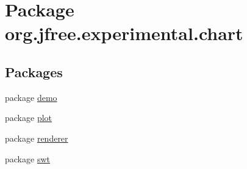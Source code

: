 \hypertarget{namespaceorg_1_1jfree_1_1experimental_1_1chart}{}\section{Package org.\+jfree.\+experimental.\+chart}
\label{namespaceorg_1_1jfree_1_1experimental_1_1chart}
\subsection*{Packages}
\begin{DoxyCompactItemize}
\item 
package \mbox{\hyperlink{namespaceorg_1_1jfree_1_1experimental_1_1chart_1_1demo}{demo}}
\item 
package \mbox{\hyperlink{namespaceorg_1_1jfree_1_1experimental_1_1chart_1_1plot}{plot}}
\item 
package \mbox{\hyperlink{namespaceorg_1_1jfree_1_1experimental_1_1chart_1_1renderer}{renderer}}
\item 
package \mbox{\hyperlink{namespaceorg_1_1jfree_1_1experimental_1_1chart_1_1swt}{swt}}
\end{DoxyCompactItemize}
